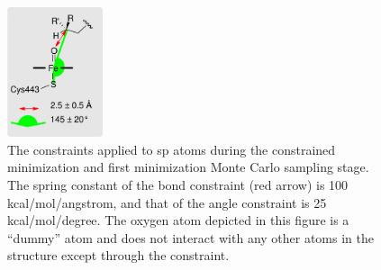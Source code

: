 \begin{figure}[hp]
\centering
\includegraphics[width=0.25\textwidth]{figures/idsite/33a}
\caption{The constraints applied to sp atoms during the constrained minimization and first minimization Monte Carlo sampling stage.
The spring constant of the bond constraint (red arrow) is 100 kcal/mol/angstrom, and that of the angle constraint is 25 kcal/mol/degree.
The oxygen atom depicted in this figure is a ``dummy'' atom and does not interact with any other atoms in the structure except through the constraint.}
\label{figure:first_sp3_constraints}
\end{figure}
